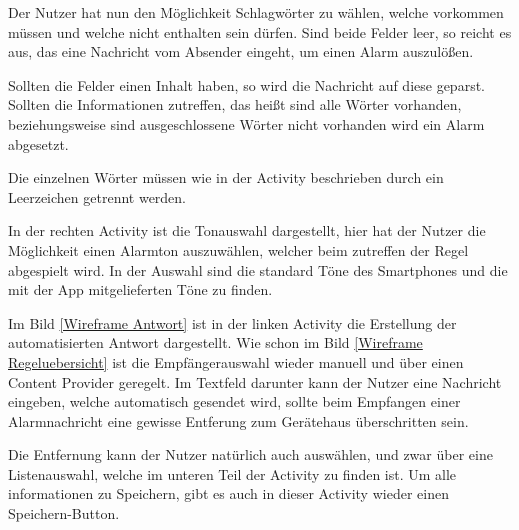 Der Nutzer hat nun den M\"oglichkeit Schlagw\"orter zu w\"ahlen, welche vorkommen m\"ussen und welche nicht enthalten sein d\"urfen. Sind beide Felder leer, so reicht es aus, das eine Nachricht vom Absender eingeht, um einen Alarm auszul\"o\ss{}en.

Sollten die Felder einen Inhalt haben, so wird die Nachricht auf diese geparst. Sollten die Informationen zutreffen, das hei\ss{}t sind alle W\"orter vorhanden, beziehungsweise sind ausgeschlossene W\"orter nicht vorhanden wird ein Alarm abgesetzt. 

Die einzelnen W\"orter m\"ussen wie in der Activity beschrieben durch ein Leerzeichen getrennt werden.

In der rechten Activity ist die Tonauswahl dargestellt, hier hat der Nutzer die M\"oglichkeit einen Alarmton auszuw\"ahlen, welcher beim zutreffen der Regel abgespielt wird. In der Auswahl sind die standard T\"one des Smartphones und die mit der App mitgelieferten T\"one zu finden.

Im Bild \ref{Wireframe Antwort} ist in der linken Activity die Erstellung der automatisierten Antwort dargestellt. Wie schon im Bild \ref{Wireframe Regeluebersicht} ist die Empf\"angerauswahl wieder manuell und \"uber einen Content Provider geregelt. Im Textfeld darunter kann der Nutzer eine Nachricht eingeben, welche automatisch gesendet wird, sollte beim Empfangen einer Alarmnachricht eine gewisse Entferung zum Ger\"atehaus \"uberschritten sein.

Die Entfernung kann der Nutzer nat\"urlich auch ausw\"ahlen, und zwar \"uber eine Listenauswahl, welche im unteren Teil der Activity zu finden ist. Um alle informationen zu Speichern, gibt es auch in dieser Activity wieder einen Speichern-Button.

